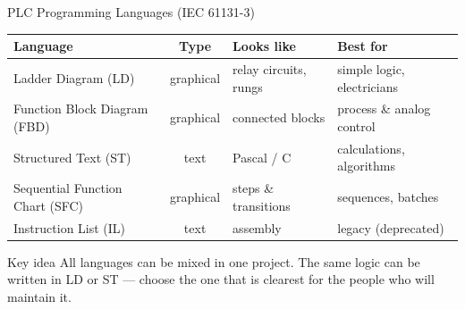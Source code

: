\documentclass[aspectratio=169]{beamer}
\begin{document}
	\begin{frame}{PLC Programming Languages (IEC 61131-3)}
		\renewcommand{\arraystretch}{1.3}
		\centering
		\small
		\begin{tabular}{@{}>{\raggedright}p{3.4cm}cp{4.2cm}p{3.6cm}@{}}
			\toprule
			\textbf{Language} & \textbf{Type} & \textbf{Looks like} & \textbf{Best for} \\
			\midrule
			Ladder Diagram (LD)        & graphical & relay circuits, rungs  & simple logic, electricians \\
			Function Block Diagram (FBD) & graphical & connected blocks     & process \& analog control \\
			Structured Text (ST)       & text      & Pascal / C             & calculations, algorithms \\
			Sequential Function Chart (SFC) & graphical & steps \& transitions & sequences, batches \\
			Instruction List (IL)      & text      & assembly               & legacy (deprecated) \\
			\bottomrule
		\end{tabular}
		\vspace{0.3cm}
		\begin{block}{Key idea}
			\small All languages can be mixed in one project. The same logic can be written in LD or ST --- choose the one that is clearest for the people who will maintain it.
		\end{block}
	\end{frame}
\end{document}
